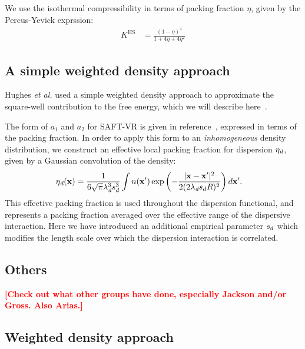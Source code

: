 \documentclass[letterpaper,twocolumn,amsmath,amssymb,pre,aps,10pt]{revtex4-1}
\newcommand\xx{\mathbf{x}}
\newcommand\fixme[1]{\textcolor{red}{\textbf{[#1]}}}
\begin{document}
We use the isothermal compressibility in terms of packing fraction $\eta$, given by the Percus-Yevick exprssion\cite{barker1976liquid}:
\begin{align}
  K^\text{HS} &= \frac{\left(1 - \eta\right)^4}{1 + 4\eta + 4\eta^2}
\end{align}

\subsection{A simple weighted density approach}

Hughes \emph{et al.} used a simple weighted density approach to
approximate the square-well contribution to the free energy, which we
will describe here~\cite{hughes2013classical}.

The form of $a_1$ and $a_2$ for SAFT-VR is given in
reference~\cite{gil-villegas-1997-SAFT-VR}, expressed in terms
of the packing fraction.  In order to apply this form to an
\emph{inhomogeneous} density distribution, we construct an effective local
packing fraction for dispersion $\eta_\textit{d}$, given by a Gaussian
convolution of the density:
\begin{align}
  \etadisp(\xx) &= \frac{1}{6\sqrt{\pi} \lambdadisp^3\lscale^3}
  \int n(\xx')\exp\left({-\frac{|\xx-\xx'|^2}{2(2 \lambdadisp
      \lscale R)^2}}\right)d\xx'.
\end{align}
This effective packing fraction is used throughout the dispersion
functional, and represents a packing fraction averaged over the
effective range of the dispersive interaction.  Here we have
introduced an additional empirical parameter $s_d$ which modifies
the length scale over which the dispersion interaction is correlated.

\subsection{Others}

\fixme{Check out what other groups have done, especially Jackson
  and/or Gross.  Also Arias.}

\subsection{Weighted density approach}
\end{document}
